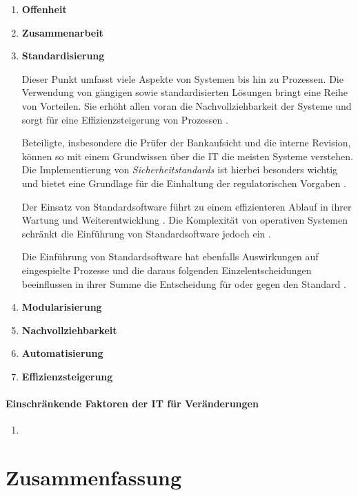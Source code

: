 \begin{enumerate}
    \item \textbf{Offenheit}
    
    \item \textbf{Zusammenarbeit}

    \item \textbf{Standardisierung} 
    
    Dieser Punkt umfasst viele Aspekte von Systemen bis hin zu Prozessen. Die Verwendung von gängigen sowie standardisierten Lösungen bringt eine Reihe von Vorteilen. Sie erhöht allen voran die Nachvollziehbarkeit der Systeme und sorgt für eine Effizienzsteigerung von Prozessen \cite{Strietzel2018, Bussmann2006, Alt2017}. 
    
    Beteiligte, insbesondere die Prüfer der Bankaufsicht und die interne Revision, können so mit einem Grundwissen über die IT die meisten Systeme verstehen. Die Implementierung von \emph{Sicherheitstandards \cite{IT-Grundschutz:2020, Disterer2013}} ist hierbei besonders wichtig und bietet eine Grundlage für die Einhaltung der regulatorischen Vorgaben \cite{MaRisk:2017, BAIT:2018}.
    
    Der Einsatz von Standardsoftware führt zu einem effizienteren Ablauf in ihrer Wartung und Weiterentwicklung \cite{Bussmann2006}. Die Komplexität von operativen Systemen schränkt die Einführung von Standardsoftware jedoch ein \cite{Bussmann2006, S. 27}. 
    
    Die Einführung von Standardsoftware hat ebenfalls Auswirkungen auf eingespielte Prozesse und die daraus folgenden Einzelentscheidungen beeinflussen in ihrer Summe die Entscheidung für oder gegen den Standard \cite{Manz2018}.
    
    \item \textbf{Modularisierung}
    
    \item \textbf{Nachvollziehbarkeit}
    
    \item \textbf{Automatisierung}
    
    \item \textbf{Effizienzsteigerung}
\end{enumerate}


\paragraph{Einschränkende Faktoren der IT für Veränderungen}
\begin{enumerate}
    \item 
\end{enumerate}


\section{Zusammenfassung}